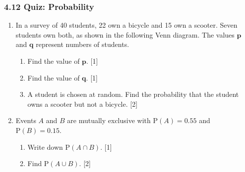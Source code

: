 \documentclass[12pt, twoside]{article}
\begin{document}
\subsubsection*{4.12 Quiz: Probability}
\begin{enumerate}[itemsep=0.1cm]

\item In a survey of 40 students, 22 own a bicycle and 15 own a scooter.
Seven students own both, as shown in the following Venn diagram.
The values $\boldsymbol{p}$ and $\boldsymbol{q}$ represent numbers of students.

\begin{center}
\end{center}

\begin{enumerate}[itemsep=0.25cm]
  \item Find the value of $\boldsymbol{p}$. \hfill [1]
  \item Find the value of $\boldsymbol{q}$. \hfill [1]
  \item A student is chosen at random. Find the probability that the student
        owns a scooter but not a bicycle. \hfill [2]
\end{enumerate}


\item Events $A$ and $B$ are mutually exclusive with
$\mathrm{P}(A) = 0.55$ and $\mathrm{P}(B) = 0.15$.

\begin{enumerate}[itemsep=0.25cm]
  \item Write down $\mathrm{P}(A \cap B)$. \hfill [1]
  \item Find $\mathrm{P}(A \cup B)$. \hfill [2]
\end{enumerate}



\end{enumerate}
\end{document}
